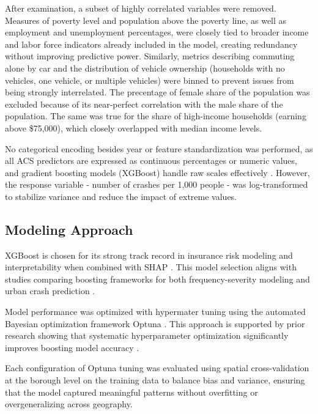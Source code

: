 \documentclass[
  number,
  review,
  3p]{elsarticle}
\begin{document}
After examination, a subset of highly correlated variables were removed.
Measures of poverty level and population above the poverty line, as well
as employment and unemployment percentages, were closely tied to broader
income and labor force indicators already included in the model,
creating redundancy without improving predictive power. Similarly,
metrics describing commuting alone by car and the distribution of
vehicle ownership (households with no vehicles, one vehicle, or multiple
vehicles) were binned to prevent issues from being strongly
interrelated. The precentage of female share of the population was
excluded because of its near-perfect correlation with the male share of
the population. The same was true for the share of high-income
households (earning above \$75,000), which closely overlapped with
median income levels.

No categorical encoding besides year or feature standardization was
performed, as all ACS predictors are expressed as continuous percentages
or numeric values, and gradient boosting models (XGBoost) handle raw
scales effectively \citep{henckaerts}. However, the response variable -
number of crashes per 1,000 people - was log-transformed to stabilize
variance and reduce the impact of extreme values.

\subsection{\texorpdfstring{\textbf{Modeling
Approach}}{Modeling Approach}}\label{modeling-approach}

XGBoost \citep{xgboost} is chosen for its strong track record in
insurance risk modeling and interpretability when combined with SHAP
\citep{dong}. This model selection aligns with studies comparing
boosting frameworks for both frequency-severity modeling
\citep{henckaerts} and urban crash prediction \citep{adeniyi}.

Model performance was optimized with hypermater tuning using the
automated Bayesian optimization framework Optuna \citep{optuna}. This
approach is supported by prior research showing that systematic
hyperparameter optimization significantly improves boosting model
accuracy \citep{liu}.

Each configuration of Optuna tuning was evaluated using spatial
cross-validation at the borough level on the training data to balance
bias and variance, ensuring that the model captured meaningful patterns
without overfitting or overgeneralizing across geography.
\end{document}
